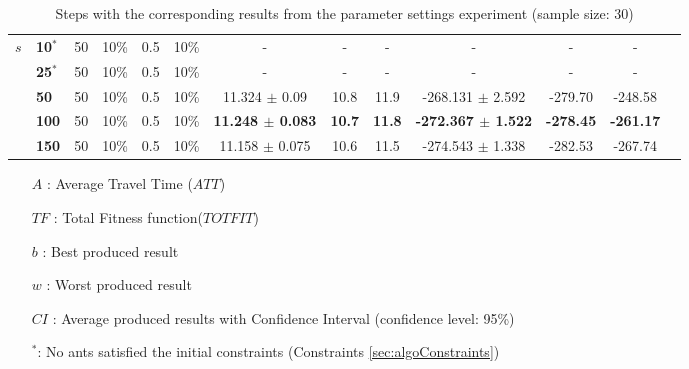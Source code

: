 \begin{sidewaystable}
\begin{tabular}{|l|l|l|l|l|l||c|c|c|c|c|c|c|}
    \hline
    $s$ & \textbf{10$^*$} & 50 & 10\% & 0.5 & 10\% & - & - & - & - & -& - \\
    ~ & \textbf{25$^*$} & 50 & 10\% & 0.5 & 10\% & - & - & - & - & - & -  \\
    ~ & \textbf{50} & 50 & 10\% & 0.5 & 10\% & 11.324 $\pm$ 0.09 & 10.8 & 11.9 & -268.131 $\pm$ 2.592 & -279.70 & -248.58\\
    ~ & \textbf{100} & 50 & 10\% & 0.5 & 10\% & \textbf{11.248 $\pm$ 0.083} & \textbf{10.7} & \textbf{11.8} & \textbf{-272.367 $\pm$ 1.522} & \textbf{-278.45} & \textbf{-261.17}\\
    ~ & \textbf{150} & 50 & 10\% & 0.5 & 10\% & 11.158 $\pm$ 0.075 & 10.6 & 11.5 & -274.543 $\pm$ 1.338 & -282.53 & -267.74\\
    \hline
    \end{tabular}
    \caption {Steps with the corresponding results from the parameter settings experiment (sample size: 30)}
    \tiny
    \begin{itemize}[noitemsep]
    \item[$A$ :] Average Travel Time ($ATT$)
    \item[$TF$ :] Total Fitness function($TOTFIT$)
    \item[$b$ :] Best produced result
    \item[$w$ :] Worst produced result
    \item[$CI$ :] Average produced results with Confidence Interval (confidence level: 95\%)
    \item[$^*$:] No ants satisfied the initial constraints (Constraints \vref{sec:algoConstraints})
    \end{itemize}
    \label{table:pm1}
\end{sidewaystable}

